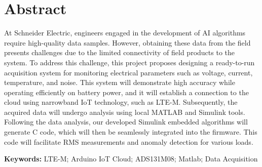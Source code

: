 \section*{Abstract}
At Schneider Electric, engineers engaged in the development of AI algorithms require high-quality data samples. However, obtaining these data from the field presents challenges due to the limited connectivity of field products to the system. To address this challenge, this project proposes designing a ready-to-run acquisition system for monitoring electrical parameters such as voltage, current, temperature, and noise. This system will demonstrate high accuracy while operating efficiently on battery power, and it will establish a connection to the cloud using narrowband IoT technology, such as LTE-M. Subsequently, the acquired data will undergo analysis using local MATLAB and Simulink tools. Following the data analysis, our developed Simulink embedded algorithms will generate C code, which will then be seamlessly integrated into the firmware. This code will facilitate RMS measurements and anomaly detection for various loads.\par
\vspace{1cm}
\textbf{Keywords:} LTE-M; Arduino IoT Cloud; ADS131M08; Matlab; Data Acquisition
\pagebreak
